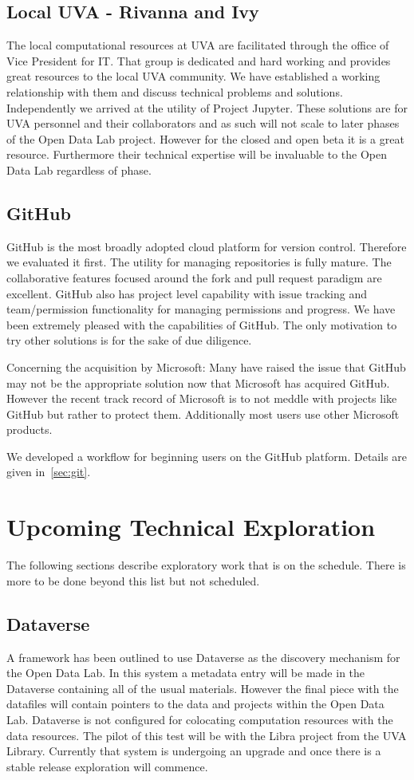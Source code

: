 \subsection{Local UVA - Rivanna and Ivy}
The local computational resources at UVA are facilitated through the office of Vice President for IT. That group is dedicated and hard working and provides great resources to the local UVA community. We have established a working relationship with them and discuss technical problems and solutions. Independently we arrived at the utility of Project Jupyter.
These solutions are for UVA personnel and their collaborators and as such will not scale to later phases of the Open Data Lab project. However for the closed and open beta it is a great resource. Furthermore their technical expertise will be invaluable to the Open Data Lab regardless of phase.

\subsection{GitHub}
GitHub is the most broadly adopted cloud platform for version control. Therefore we evaluated it first. The utility for managing repositories is fully mature. The collaborative features focused around the fork and pull request paradigm are excellent. GitHub also has project level capability with issue tracking and team/permission functionality for managing permissions and progress. We have been extremely pleased with the capabilities of GitHub. The only motivation to try other solutions is for the sake of due diligence.

Concerning the acquisition by Microsoft: Many have raised the issue that GitHub may not be the appropriate solution now that Microsoft has acquired GitHub. However the recent track record of Microsoft is to not meddle with projects like GitHub but rather to protect them. Additionally most users use other Microsoft products. 

We developed a workflow for beginning users on the GitHub platform. Details are given in~\ref{sec:git}.

\section{Upcoming Technical Exploration}
The following sections describe exploratory work that is on the schedule. There is more to be done beyond this list but not scheduled.
\subsection{Dataverse}
A framework has been outlined to use Dataverse as the discovery mechanism for the Open Data Lab. In this system a metadata entry will be made in the Dataverse containing all of the usual materials. However the final piece with the datafiles will contain pointers to the data and projects within the Open Data Lab. Dataverse is not configured for colocating computation resources with the data resources. The pilot of this test will be with the Libra project from the UVA Library. Currently that system is undergoing an upgrade and once there is a stable release exploration will commence.
